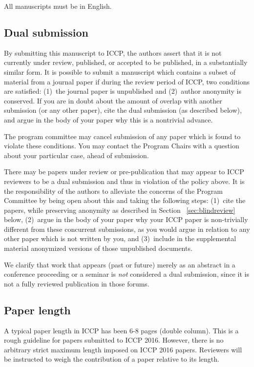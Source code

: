 \documentclass[10pt,twocolumn,letterpaper]{article}
\begin{document}
All manuscripts must be in English.

\subsection{Dual submission}

By submitting this manuscript to ICCP, the authors assert that it is not currently under review, published, or accepted to be published, in a substantially similar form. It is possible to submit a manuscript which contains a subset of material from a journal paper if during the review period of ICCP, two conditions are satisfied: (1)~the journal paper is unpublished and (2)~author anonymity is conserved.
If you are in doubt about the amount of overlap with another submission (or any other paper), cite the dual submission (as described below), and argue in the body of your paper why this is a nontrivial advance.

The program committee may cancel submission of any paper which is found to violate these conditions. You may contact the Program Chairs with a question about your particular case, ahead of submission.

There may be papers under review or pre-publication that may appear to ICCP reviewers to be a dual submission and thus in violation of the policy above. It is the responsibility of the authors to alleviate the concerns of the Program Committee by being open about this and taking the following steps: (1)~cite the papers, while preserving anonymity as described in Section
 ~\ref{sec:blindreview} below, (2)~argue in the body of your paper why your ICCP paper is non-trivially different from these concurrent submissions, as you would argue in relation to any other paper which is not written by you, and (3)~include in the supplemental material anonymized versions of those unpublished documents.

We clarify that work that appears (past or future) merely as an abstract in a conference proceeding or a seminar is {\em not} considered a dual submission, since it is not a fully reviewed publication in those forums.

\subsection{Paper length}

A typical paper length in ICCP has been 6-8 pages (double column). This is a rough guideline for papers submitted to ICCP 2016. However, there is no arbitrary strict maximum length imposed on ICCP 2016 papers. Reviewers will be instructed to weigh the contribution of a paper relative to its length.
\end{document}
